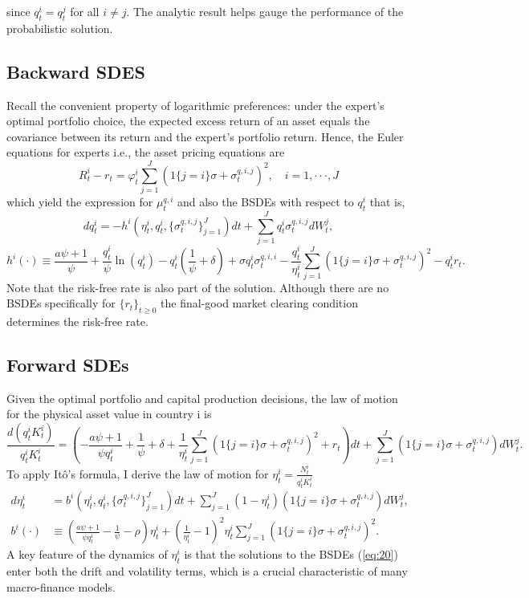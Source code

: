 \documentclass{article}
\begin{document}
\clearpage

since $q_{t}^{i}=q_{t}^{j}$ for all $i\ne j$. The analytic result helps gauge the performance of the probabilistic solution.

\subsection{Backward SDES}

Recall the convenient property of logarithmic preferences: under the expert's optimal portfolio choice, the expected excess return of an asset equals the covariance between its return and the expert's portfolio return. Hence, the Euler equations for experts i.e., the asset pricing equations are
\[
R_{t}^{i}-r_{t}=\varphi_{t}^{i}\sum_{j=1}^{J}(1\{j=i\}\sigma+\sigma_{t}^{q,i,j})^{2}, \quad i=1,\cdot\cdot\cdot,J
\]
which yield the expression for $\mu_{t}^{q,i}$ and also the BSDEs with respect to $q_{t}^{i}$ that is,
\begin{equation}
dq_{t}^{i}=-h^{i}(\eta_{t}^{i},q_{t}^{i},\{\sigma_{t}^{q,i,j}\}_{j=1}^{J})dt+\sum_{j=1}^{J}q_{t}^{i}\sigma_{t}^{q,i,j}dW_{t}^{j},
\label{eq:20}
\end{equation}
\[
h^{i}(\cdot)\equiv\frac{a\psi+1}{\psi}+\frac{q_{t}^{i}}{\psi}\ln(q_{t}^{i})-q_{t}^{i}(\frac{1}{\psi}+\delta)+\sigma q_{t}^{i}\sigma_{t}^{q,i,i}-\frac{q_{t}^{i}}{\eta_{t}^{i}}\sum_{j=1}^{J}(1\{j=i\}\sigma+\sigma_{t}^{q,i,j})^{2}-q_{t}^{i}r_{t}.
\]
Note that the risk-free rate is also part of the solution. Although there are no BSDEs specifically for $\{r_{t}\}_{t\ge0}$ the final-good market clearing condition determines the risk-free rate.

\subsection{Forward SDEs}

Given the optimal portfolio and capital production decisions, the law of motion for the physical asset value in country i is
\[
\frac{d(q_{t}^{i}K_{t}^{i})}{q_{t}^{i}K_{t}^{i}}=\left(-\frac{a\psi+1}{\psi q_{t}^{i}}+\frac{1}{\psi}+\delta+\frac{1}{\eta_{t}^{i}}\sum_{j=1}^{J}(1\{j=i\}\sigma+\sigma_{t}^{q,i,j})^{2}+r_{t}\right)dt+\sum_{j=1}^{J}(1\{j=i\}\sigma+\sigma_{t}^{q,i,j})dW_{t}^{j}.
\]
To apply Itô's formula, I derive the law of motion for $\eta_{t}^{i}=\frac{N_{t}^{i}}{q_{t}^{i}K_{t}^{i}}$
\begin{equation}
\begin{aligned}
d\eta_{t}^{i}&=b^{i}(\eta_{t}^{i},q_{t}^{i},\{\sigma_{t}^{q,i,j}\}_{j=1}^{J})dt+\sum_{j=1}^{J}(1-\eta_{t}^{i})(1\{j=i\}\sigma+\sigma_{t}^{q,i,j})dW_{t}^{j}, \\
b^{i}(\cdot)&\equiv\left(\frac{a\psi+1}{\psi q_{t}^{i}}-\frac{1}{\psi}-\rho\right)\eta_{t}^{i}+\left(\frac{1}{\eta_{t}^{i}}-1\right)^{2}\eta_{t}^{i}\sum_{j=1}^{J}(1\{j=i\}\sigma+\sigma_{t}^{q,i,j})^{2}.
\end{aligned}
\label{eq:21}
\end{equation}
A key feature of the dynamics of $\eta_{t}^{i}$ is that the solutions to the BSDEs (\ref{eq:20}) enter both the drift and volatility terms, which is a crucial characteristic of many macro-finance models.
\end{document}
